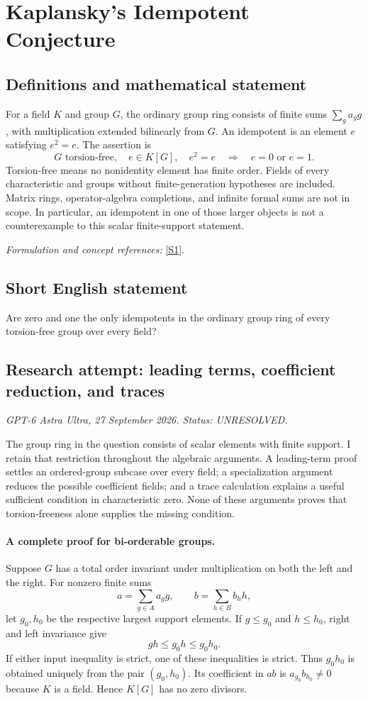 \documentclass[11pt]{article}
\begin{document}
\section*{\texorpdfstring{Kaplansky's Idempotent Conjecture}{Kaplansky's Idempotent Conjecture}}\label{30006836}
\subsection{Definitions and mathematical statement}
For a field $K$ and group $G$, the ordinary group ring consists of finite sums $\sum_g a_gg$, with multiplication extended bilinearly from $G$. An idempotent is an element $e$ satisfying $e^2=e$. The assertion is
\[
 G\text{ torsion-free},\quad e\in K[G],\quad e^2=e
 \quad\Longrightarrow\quad e=0\text{ or }e=1.
\]
Torsion-free means no nonidentity element has finite order. Fields of every characteristic and groups without finite-generation hypotheses are included. Matrix rings, operator-algebra completions, and infinite formal sums are not in scope. In particular, an idempotent in one of those larger objects is not a counterexample to this scalar finite-support statement.
\par\smallskip\textit{Formulation and concept references:} \href{https://arxiv.org/pdf/1904.04847}{[S1]}.

\subsection{Short English statement}
Are zero and one the only idempotents in the ordinary group ring of every torsion-free group over every field?
\subsection{Research attempt: leading terms, coefficient reduction, and traces}
\textit{GPT-6 Astra Ultra, 27 September 2026. Status: UNRESOLVED.}

The group ring in the question consists of scalar elements with finite support. I retain that restriction throughout the algebraic arguments. A leading-term proof settles an ordered-group subcase over every field; a specialization argument reduces the possible coefficient fields; and a trace calculation explains a useful sufficient condition in characteristic zero. None of these arguments proves that torsion-freeness alone supplies the missing condition.

\paragraph{A complete proof for bi-orderable groups.}
Suppose $G$ has a total order invariant under multiplication on both the left and the right. For nonzero finite sums
\[
 a=\sum_{g\in A}a_g g,\qquad b=\sum_{h\in B}b_h h,
\]
let $g_0,h_0$ be the respective largest support elements. If $g\le g_0$ and $h\le h_0$, right and left invariance give
\[
 gh\le g_0h\le g_0h_0.
\]
If either input inequality is strict, one of these inequalities is strict. Thus $g_0h_0$ is obtained uniquely from the pair $(g_0,h_0)$. Its coefficient in $ab$ is $a_{g_0}b_{h_0}\ne0$ because $K$ is a field. Hence $K[G]$ has no zero divisors.
\end{document}
